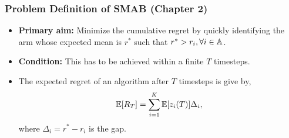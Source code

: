 \begin{frame}
\frametitle{Problem Definition of SMAB ({Chapter 2})}
\begin{itemize}
\item<1-> \textbf{Primary aim:} Minimize the cumulative regret by quickly identifying the arm whose expected mean is $r^*$ such that $r^* > r_i,\forall i\in\mathbb{A}$.
\item<2-> \textbf{Condition:} This has to be achieved within a finite $T$ timesteps.
\item<3-> The expected regret of an algorithm after $T$ timesteps is give by,
\begin{align*}
\mathbb{E}[R_{T}]= \sum_{i=1}^{K} \mathbb{E}[z_i (T)] \Delta_i,
\end{align*}
where $\Delta_{i}=r^{*}-r_{i}$ is the gap.
\end{itemize}
\end{frame}

%
%

